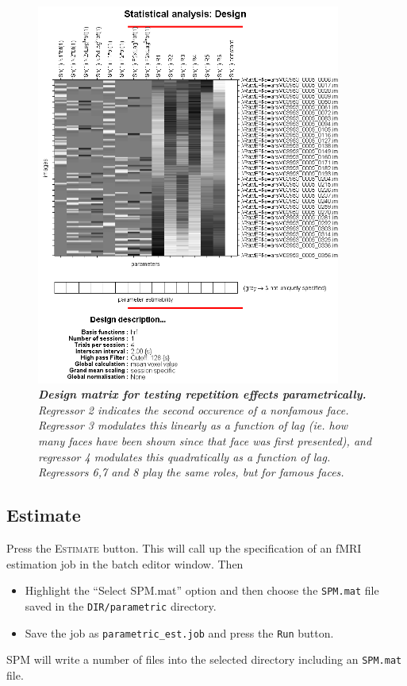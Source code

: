 \begin{figure}
\begin{center}
\includegraphics[width=100mm]{faces/par_design}
\caption{\em \textbf{Design matrix for testing repetition effects parametrically.} Regressor 2 indicates the second occurence of a nonfamous face. Regressor 3 modulates this linearly as a function of lag (ie. how many faces have been shown since that face was first presented), and regressor 4 modulates this quadratically as a function of lag. Regressors 6,7 and 8 play the same roles, but for famous faces. \label{par_design} }
\end{center}
\end{figure}

\subsection{Estimate}

Press the \textsc{Estimate} button. This will call up the specification of an fMRI estimation job in the batch editor window. Then
\begin{itemize}
\item Highlight the ``Select SPM.mat'' option and then choose the \texttt{SPM.mat} file saved in the \texttt{DIR/parametric} directory.
\item Save the job as \texttt{parametric\_est.job} and press the \texttt{Run} button.
\end{itemize}
SPM will write a number of files into the selected directory including an \texttt{SPM.mat} file.

